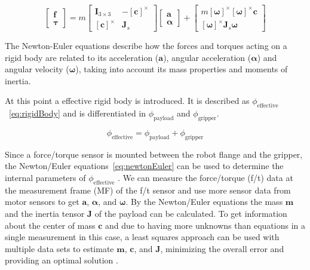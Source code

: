     \begin{equation}
    \begin{bmatrix} \mathbf{f} \\ \boldsymbol{\tau} \end{bmatrix} = m \begin{bmatrix} \mathbf{I}_{3 \times 3} & -[\mathbf{c}]^\times \\ [\mathbf{c}]^\times & \mathbf{J}_s \end{bmatrix} \begin{bmatrix} \mathbf{a} \\ \boldsymbol{\alpha} \end{bmatrix} + \begin{bmatrix} m[\boldsymbol{\omega}]^\times[\boldsymbol{\omega}]^\times\mathbf{c} \\ [\boldsymbol{\omega}]^\times \mathbf{J}_s \boldsymbol{\omega} \end{bmatrix}
    \label{eq:newtonEuler}
    \end{equation}
    
    The Newton-Euler equations describe how the forces and torques acting on a rigid body are related to its acceleration (\(\mathbf{a}\)), angular acceleration (\(\boldsymbol{\alpha}\))  and angular velocity (\(\boldsymbol{\omega}\)), taking into account its mass properties and moments of inertia.
    
    At this point a effective rigid body is introduced. It is described as \(\phi_{\text{effective}}\)~\eqref{eq:rigidBody} and is differentiated in \(\phi_{\text{payload}}\) and \(\phi_{\text{gripper}}\).
    
    \begin{equation}
    \phi_{\text{effective}} = \phi_{\text{payload}} + \phi_{\text{gripper}}
    \label{eq:rigidEffective}
    \end{equation}
    
    Since a force/torque sensor is mounted between the robot flange and the gripper, the Newton/Euler equations~\eqref{eq:newtonEuler} can be used to determine the internal parameters of \(\phi_{\text{effective}}\) \cite{kurdas2022online, nadeau2022fast}. We can measure the force/torque (f/t) data at the measurement frame (MF) of the f/t sensor and use more sensor data from motor sensors to get \(\mathbf{a}\), \(\boldsymbol{\alpha}\), and \(\boldsymbol{\omega}\). By the Newton/Euler equations the mass $\boldsymbol{m}$ and the inertia tensor $\boldsymbol{J}$ of the payload can be calculated. To get information about the center of mass $\boldsymbol{c}$ and due to having more unknowns than equations in a single measurement in this case, a least squares approach can be used with multiple data sets to estimate $\boldsymbol{m}$, $\boldsymbol{c}$, and $\boldsymbol{J}$, minimizing the overall error and providing an optimal solution \cite{kurdas2022online, nadeau2022fast}.
    
